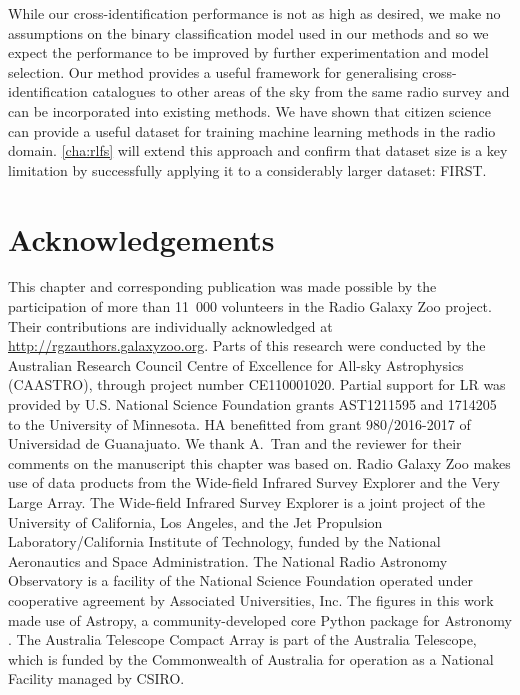   While our cross-identification performance is not as high as desired, we
  make no assumptions on the binary classification model used in our methods
  and so we expect the performance to be improved by further experimentation
  and model selection. Our method provides a useful framework for generalising
  cross-identification catalogues to other areas of the sky from the same
  radio survey and can be incorporated into existing methods. {We have
  shown that citizen science can provide a useful dataset for training machine
  learning methods in the radio domain.} \autoref{cha:rlfs} will extend this
  approach and confirm that dataset size is a key limitation by successfully applying it to a considerably larger dataset: FIRST.

\section{Acknowledgements}

  This chapter and corresponding publication was made possible by the participation of more than
  11~000 volunteers in the Radio Galaxy Zoo project. Their contributions are
  individually acknowledged at \url{http://rgzauthors.galaxyzoo.org}. Parts of
  this research were conducted by the Australian Research Council Centre of
  Excellence for All-sky Astrophysics (CAASTRO), through project number
  CE110001020. Partial support for LR was provided by U.S. National Science
  Foundation grants AST1211595 and 1714205 to the University of Minnesota. HA
  benefitted from grant 980/2016-2017 of Universidad de Guanajuato. We thank
  A.~Tran and the reviewer for their comments on the manuscript this chapter was based on.
  Radio Galaxy Zoo makes use of
  data products from the Wide-field Infrared Survey Explorer and the Very
  Large Array. The Wide-field Infrared Survey Explorer is a joint project of
  the University of California, Los Angeles, and the Jet Propulsion
  Laboratory/California Institute of Technology, funded by the National
  Aeronautics and Space Administration. The National Radio Astronomy
  Observatory is a facility of the National Science Foundation operated under
  cooperative agreement by Associated Universities, Inc. The figures
  in this work made use of Astropy, a community-developed core Python package
  for Astronomy \citep{astropy}. The Australia Telescope Compact Array is part
  of the Australia Telescope, which is funded by the Commonwealth of Australia
  for operation as a National Facility managed by CSIRO.
